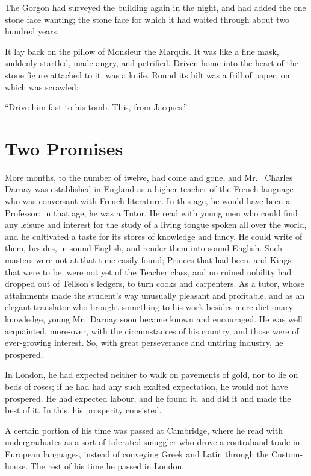 The Gorgon had surveyed the building again in the night, and had
added the one stone face wanting; the stone face for which it had
waited through about two hundred years.

It lay back on the pillow of Monsieur the Marquis.  It was like a
fine mask, suddenly startled, made angry, and petrified.  Driven home
into the heart of the stone figure attached to it, was a knife.
Round its hilt was a frill of paper, on which was scrawled:

``Drive him fast to his tomb.  This, from Jacques.''



\chapter{Two Promises}


More months, to the number of twelve, had come and gone, and Mr.\ %
Charles Darnay was established in England as a higher teacher of the
French language who was conversant with French literature.  In this
age, he would have been a Professor; in that age, he was a Tutor.
He read with young men who could find any leisure and interest for
the study of a living tongue spoken all over the world, and he
cultivated a taste for its stores of knowledge and fancy.  He could
write of them, besides, in sound English, and render them into sound
English.  Such masters were not at that time easily found; Princes
that had been, and Kings that were to be, were not yet of the Teacher
class, and no ruined nobility had dropped out of Tellson's ledgers,
to turn cooks and carpenters.  As a tutor, whose attainments made the
student's way unusually pleasant and profitable, and as an elegant
translator who brought something to his work besides mere dictionary
knowledge, young Mr.\ Darnay soon became known and encouraged.  He was
well acquainted, more-over, with the circumstances of his country,
and those were of ever-growing interest.  So, with great perseverance
and untiring industry, he prospered.

In London, he had expected neither to walk on pavements of gold, nor
to lie on beds of roses; if he had had any such exalted expectation,
he would not have prospered.  He had expected labour, and he found it,
and did it and made the best of it.  In this, his prosperity consisted.

A certain portion of his time was passed at Cambridge, where he read
with undergraduates as a sort of tolerated smuggler who drove a
contraband trade in European languages, instead of conveying Greek
and Latin through the Custom-house.  The rest of his time he passed
in London.

